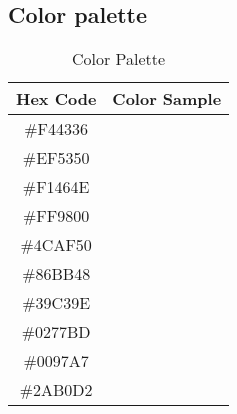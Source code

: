 \subsection*{Color palette}
\begin{table}[h]
    \centering
    \renewcommand{\arraystretch}{1.5} %
    \setlength{\tabcolsep}{12pt} %
    \begin{tabular}{c c}
        \toprule
        \textbf{Hex Code} & \textbf{Color Sample} \\
        \midrule
        \#F44336 & \cellcolor[HTML]{F44336} \hspace{2cm} \\
        \#EF5350 & \cellcolor[HTML]{EF5350} \hspace{2cm} \\
        \#F1464E & \cellcolor[HTML]{F1464E} \hspace{2cm} \\
        \#FF9800 & \cellcolor[HTML]{FF9800} \hspace{2cm} \\
        \midrule
        \#4CAF50 & \cellcolor[HTML]{4CAF50} \hspace{2cm} \\
        \#86BB48 & \cellcolor[HTML]{86BB48} \hspace{2cm} \\
        \#39C39E & \cellcolor[HTML]{39C39E} \hspace{2cm} \\
        \midrule
        \#0277BD & \cellcolor[HTML]{0277BD} \hspace{2cm} \\
        \#0097A7 & \cellcolor[HTML]{0097A7} \hspace{2cm} \\
        \#2AB0D2 & \cellcolor[HTML]{2AB0D2} \hspace{2cm} \\
        \bottomrule
    \end{tabular}
    \caption{Color Palette}
    \label{tab:color_palette}
\end{table}

